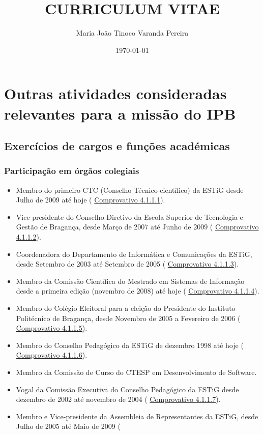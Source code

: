 \documentclass[11pt]{article}
\title{CURRICULUM VITAE  \\

\vspace{3cm}
\vspace{3cm}}
\author{Maria João Tinoco Varanda Pereira}
\date{
\today}
\begin{document}
 
\maketitle 
\newpage
\section{Outras atividades consideradas relevantes para a missão do IPB}
\subsection{Exercícios de cargos e funções académicas}
\subsubsection{Participação em órgãos colegiais}
\begin{itemize}
\item{Membro do primeiro CTC (Conselho Técnico-científico) da ESTiG desde Julho de 2009 até hoje (
\href{run:MissaoIPBCargos/ctc.pdf}{Comprovativo 4.1.1.1}). }
\item{Vice-presidente do Conselho Diretivo da Escola Superior de Tecnologia e Gestão de Bragança, desde Março de 2007 até Junho de 2009 (
\href{run:MissaoIPBCargos/subdiretora.pdf}{Comprovativo 4.1.1.2}).}
\item{Coordenadora do Departamento de Informática e Comunicações da ESTiG, desde Setembro de 2003 até Setembro de 2005 (
\href{run:MissaoIPBCargos/coordDIC.pdf}{Comprovativo 4.1.1.3}).}
\item{Membro da Comissão Científica do Mestrado em Sistemas de Informação desde a primeira edição (novembro de 2008) até hoje (
\href{run:MissaoIPBCargos/msi.pdf}{Comprovativo 4.1.1.4}).}
\item{Membro do Colégio Eleitoral para a eleição do Presidente do Instituto Politécnico de Bragança, desde Novembro de 2005 a Fevereiro de 2006 (
\href{run:MissaoIPBCargos/colegioeleitoral.pdf}{Comprovativo 4.1.1.5}).}
\item{Membro do Conselho Pedagógico da ESTiG de dezembro 1998 até hoje (
\href{run:MissaoIPBCargos/CP.pdf}{Comprovativo 4.1.1.6}).  }
\item{Membro da Comissão de Curso do CTESP em Desenvolvimento de Software.}
\item{Vogal da Comissão Executiva do Conselho Pedagógico da ESTiG desde dezembro de 2002 até novembro de 2004 (
\href{run:MissaoIPBCargos/CP.pdf}{Comprovativo 4.1.1.7}).}
\item{Membro e Vice-presidente da Assembleia de Representantes da ESTiG, desde Julho de 2005 até Maio de 2009 (
}
\end{itemize}
\end{document}
